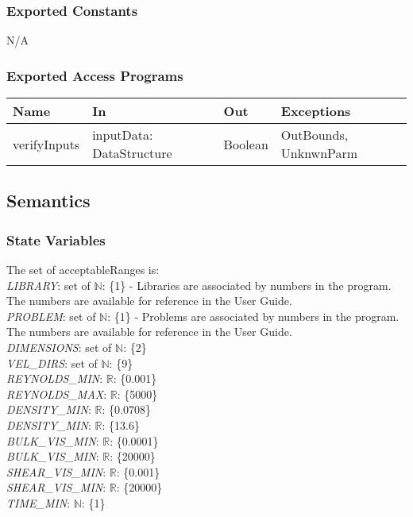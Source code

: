 \documentclass[12pt, titlepage]{article}
\begin{document}
\subsubsection{Exported Constants}
N/A

\subsubsection{Exported Access Programs}

\begin{center}
	\begin{tabular}{p{2cm} p{3cm} p{3cm} p{2.5cm}}
		\hline
		\textbf{Name} & \textbf{In} & \textbf{Out} & \textbf{Exceptions} \\
		\hline
		verifyInputs & inputData: DataStructure & Boolean & OutBounds, UnknwnParm \\
		\hline
	\end{tabular}
\end{center}

\subsection{Semantics}

\subsubsection{State Variables}
The set of acceptableRanges is:\\
\textit{LIBRARY}: set of $\mathbb{N}$: \{1\} - Libraries are associated by
numbers in the program. The numbers are available for reference in the User
Guide. \\
\textit{PROBLEM}: set of $\mathbb{N}$: \{1\} - Problems are associated by
numbers in the program. The numbers are available for reference in the User
Guide.\\
\textit{DIMENSIONS}: set of $\mathbb{N}$: \{2\}\\
\textit{VEL\_DIRS}: set of $\mathbb{N}$: \{9\}\\
\textit{REYNOLDS\_MIN}: $\mathbb{R}$: \{0.001\}\\
\textit{REYNOLDS\_MAX}: $\mathbb{R}$: \{5000\}\\
\textit{DENSITY\_MIN}: $\mathbb{R}$: \{0.0708\}\\
\textit{DENSITY\_MIN}: $\mathbb{R}$: \{13.6\}\\
\textit{BULK\_VIS\_MIN}: $\mathbb{R}$: \{0.0001\}\\
\textit{BULK\_VIS\_MIN}: $\mathbb{R}$: \{20000\}\\
\textit{SHEAR\_VIS\_MIN}: $\mathbb{R}$: \{0.001\}\\
\textit{SHEAR\_VIS\_MIN}: $\mathbb{R}$: \{20000\}\\
\textit{TIME\_MIN}: $\mathbb{N}$: \{1\}\\
\end{document}
